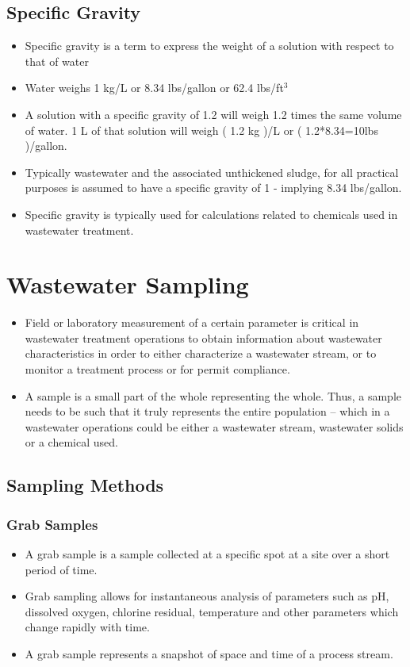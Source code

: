 \subsection{Specific Gravity}				
			\begin{itemize}
				\item Specific gravity is a term to express the weight of a solution with respect to that of water
				\item Water weighs 1 kg/L or 8.34 lbs/gallon or 62.4 lbs/ft$^3$
				\item A solution with a specific gravity of 1.2 will weigh 1.2 times the same volume of water.  1 L of that solution will weigh ( 1.2 kg )/L  or  ( 1.2*8.34=10lbs )/gallon.
				\item Typically wastewater and the associated unthickened sludge, for all practical purposes is assumed to have a specific gravity of 1 - implying 8.34 lbs/gallon.
				\item Specific gravity is typically used for calculations related to chemicals used in wastewater treatment.
			\end{itemize}
			
\section{Wastewater Sampling}
		\begin{itemize}
			\item Field or laboratory measurement of a certain parameter is critical in wastewater treatment operations to obtain information about wastewater characteristics in order to either characterize a wastewater stream, or to monitor a treatment process or for permit compliance.  
			\item A sample is a small part of the whole representing the whole.  Thus, a sample needs to be such that it truly represents the entire population – which in a wastewater operations could be either a wastewater stream, wastewater solids or a chemical used.
		\end{itemize}
		
\subsection{Sampling Methods}
\subsubsection{Grab Samples}
				\begin{itemize}
					\item A grab sample is a sample collected at a specific spot at a site over a short period of time.  
					\item Grab sampling allows for instantaneous analysis of parameters such as pH, dissolved oxygen, chlorine residual, temperature and other parameters which change rapidly with time.
					\item A grab sample represents a snapshot of space and time of a process stream.
					\end{itemize}
